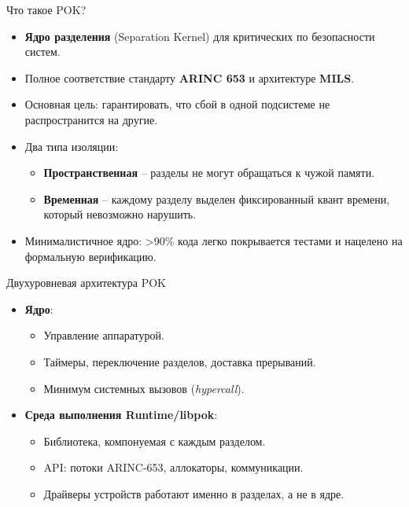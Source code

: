
\begin{frame}{Что такое POK?}
    \begin{itemize}
        \item \textbf{Ядро разделения} (Separation Kernel) для критических по безопасности систем.
        \item Полное соответствие стандарту \textbf{ARINC 653} и архитектуре \textbf{MILS}.
        \item Основная цель: гарантировать, что сбой в одной подсистеме не распространится на другие.
        \item Два типа изоляции:
        \begin{itemize}
            \item \textbf{Пространственная} -- разделы не могут обращаться к чужой памяти.
            \item \textbf{Временная} -- каждому разделу выделен фиксированный квант времени, который невозможно нарушить.
        \end{itemize}
        \item Минималистичное ядро: >90\% кода легко покрывается тестами и нацелено на формальную верификацию.
    \end{itemize}
\end{frame}

\begin{frame}{Двухуровневая архитектура POK}
    \begin{itemize}
        \item \textbf{Ядро}:
        \begin{itemize}
            \item Управление аппаратурой.
            \item Таймеры, переключение разделов, доставка прерываний.
            \item Минимум системных вызовов (\textit{hypercall}).
        \end{itemize}
        \item \textbf{Среда выполнения Runtime/libpok}:
        \begin{itemize}
            \item Библиотека, компонуемая с каждым разделом.
            \item API: потоки ARINC-653, аллокаторы, коммуникации.
            \item Драйверы устройств работают именно в разделах, а не в ядре.
        \end{itemize}
    \end{itemize}
\end{frame}

